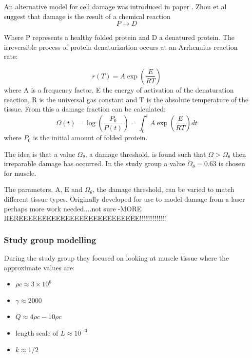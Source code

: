\documentclass[11pt]{article} %
\begin{document}
		An alternative model for cell damage was introduced in  paper  \cite{Zhou2007}. Zhou et al suggest that damage is the result of a chemical reaction 
		\begin{equation}
		P\rightarrow D
		\end{equation}
		
		Where P represents a healthy folded protein and D a denatured protein. The irreversible process of protein denaturization occurs at an Arrhenuius reaction rate:
		
		\begin{equation}
			r(T)=A\exp\left( \frac{E}{RT}\right) 
		\end{equation}	
		where A is a frequency factor, E the energy of activation of the denaturation reaction, R is the universal gas constant and T is the absolute temperature of the tissue. From this a damage fraction can be calculated:
		\begin{equation}
			\Omega(t)=\log\left( \frac{P_0}{P(t)}\right) =\int_{0}^{t}A\exp\left( \frac{E}{RT}\right) dt
		\end{equation}
		where $ P_0$ is the initial amount of folded protein.
		
		The idea is that a value $\Omega_\theta$, a damage threshold, is found such that $\Omega>\Omega_\theta$ then irreparable damage has occurred. In the study group a value $\Omega_\theta=0.63$ is chosen for muscle. 
		
		
	 	The parameters, A, E and $\Omega_\theta$, the damage threshold, can be varied to match different tissue types. Originally developed for use to model damage from a laser perhaps more work needed....not sure -MORE HEREEEEEEEEEEEEEEEEEEEEEEEEEE!!!!!!!!!!!!!!
	 	
	 	
	 	\subsubsection{Study group modelling}
	 	
	 	During the study group they focused on looking at muscle tissue where the approximate values are:
	 	\begin{itemize}
	 		\item $\rho c \approx 3 \times 10^6$
	 		\item $\gamma \approx 2000$
	 		\item $Q \approx 4\rho c-10 \rho c$
	 		\item length scale of $L \approx 10^{-3}$
	 		\item $k \approx 1/2$
	 	\end{itemize}
 	
\end{document}
